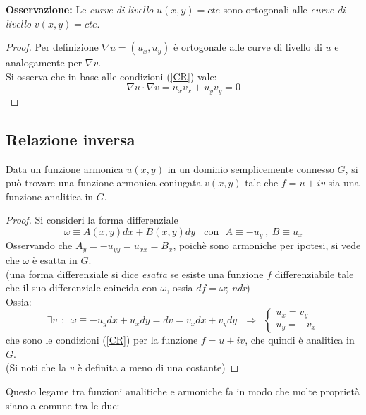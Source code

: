\documentclass[twoside]{article}
\begin{document}
\textbf{Osservazione:} Le \textit{curve di livello} $u(x,y)=cte$ sono ortogonali alle \textit{curve di livello} $v(x,y)=cte$.
\\
\begin{proof}
Per definizione $\nabla u=(u_x,u_y)$ è ortogonale alle curve di livello di $u$ e analogamente per $\nabla v$.
\\
Si osserva che in base alle condizioni (\ref{CR}) vale:
\begin{equation}
   \nabla u \cdot \nabla v =u_x v_x + u_y v_y =0
\end{equation}
\end{proof}

\subsection{Relazione inversa}
Data un funzione armonica $u(x,y)$ in un dominio semplicemente connesso $G$, si può trovare una funzione armonica coniugata $v(x,y)$ tale che $f=u+iv$ sia una funzione analitica in $G$.

\begin{proof}
Si consideri la forma differenziale 
\begin{equation}
    \omega \equiv A(x,y)dx+B(x,y)dy \ \ \ \ \text{con} \ \ \ A\equiv -u_y \ , \ B\equiv u_x
\end{equation}
Osservando che $A_y=-u_{yy}=u_{xx}=B_x$, poichè sono armoniche per ipotesi, si vede che $\omega$ è esatta in $G$.
\\
(una forma differenziale si dice \textit{esatta} se esiste una funzione $f$ differenziabile tale che il suo differenziale coincida con $\omega$, ossia $df=\omega$; \textit{ndr})
\\
Ossia:
\begin{equation}
    \exists v \ \ : \ \ \omega \equiv -u_y dx + u_x dy = dv = v_x dx + v_y dy \ \ \ \Rightarrow \ \ \left \{ \begin{array}{lr}
         u_x=v_y  \\
         u_y=-v_x 
    \end{array}
    \right.
\end{equation}
che sono le condizioni (\ref{CR}) per la funzione $f=u+iv$, che quindi è analitica in $G$.
\\
(Si noti che la $v$ è definita a meno di una costante)

\end{proof}

Questo legame tra funzioni analitiche e armoniche fa in modo che molte proprietà siano a comune tra le due:
\end{document}
